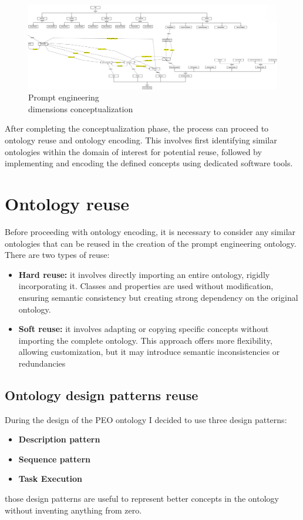 \begin{figure}[H]
    \centering
    \includegraphics[width=0.9\linewidth]{Figures/fig_27.png}
    \caption{Prompt engineering\\ dimensions conceptualization}
    \label{fig:enter-label}
\end{figure}
After completing the conceptualization phase, the process can proceed to ontology reuse and ontology encoding. This involves first identifying similar ontologies within the domain of interest for potential reuse, followed by implementing and encoding the defined concepts using dedicated software tools.

\newpage
\section{Ontology reuse}
Before proceeding with ontology encoding, it is necessary to consider any similar ontologies that can be reused in the creation of the prompt engineering ontology. There are two types of reuse:
\begin{itemize}
    \item \textbf{Hard reuse:} it involves directly importing an entire ontology, rigidly incorporating it. Classes and properties are used without modification, ensuring semantic consistency but creating strong dependency on the original ontology.

    \item \textbf{Soft reuse:} it involves adapting or copying specific concepts without importing the complete ontology. This approach offers more flexibility, allowing customization, but it may introduce semantic inconsistencies or redundancies 
\end{itemize}

\subsection{Ontology design patterns reuse}
During the design of the PEO ontology I decided to use three design patterns:
\begin{itemize}
    \item \textbf{Description pattern}
    \item \textbf{Sequence pattern}
    \item \textbf{Task Execution}
\end{itemize}
those design patterns are useful to represent better concepts in the ontology without inventing anything from zero.

